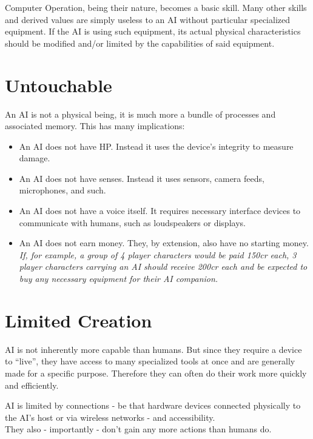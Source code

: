 \documentclass[12pt,a4paper,openany,usenames,dvipsnames]{book}
\begin{document}
	Computer Operation, being their nature, becomes a basic skill.
	Many other skills and derived values are simply useless to an AI without particular specialized equipment.
	If the AI is using such equipment, its actual physical characteristics should be modified and/or limited by the capabilities of said equipment.

	\chapter{Untouchable}
	An AI is not a physical being, it is much more a bundle of processes and associated memory. This has many implications:
	\vspace{-8mm}
	\begin{itemize}
		\setlength\itemsep{-8mm}
		\item An AI does not have HP. Instead it uses the device’s integrity to measure damage.
		\item An AI does not have senses. Instead it uses sensors, camera feeds, microphones, and such.
		\item An AI does not have a voice itself. It requires necessary interface devices to communicate with humans, such as loudspeakers or displays.
		\item An AI does not earn money.
			They, by extension, also have no starting money.\\
			\textit{If, for example, a group of 4 player characters would be paid 150cr each, 3 player characters carrying an AI should receive 200cr each and be expected to buy any necessary equipment for their AI companion.}
	\end{itemize}

	\chapter{Limited Creation}
	AI is not inherently more capable than humans.
	But since they require a device to “live”,
		they have access to many specialized tools at once
		and are generally made for a specific purpose.
	Therefore they can often do their work more quickly and efficiently.
	\par
	AI is limited by connections - be that hardware devices connected physically to the AI's host or via wireless networks - and accessibility.
	\\%
	They also - importantly - don’t gain any more actions than humans do.
\end{document}
